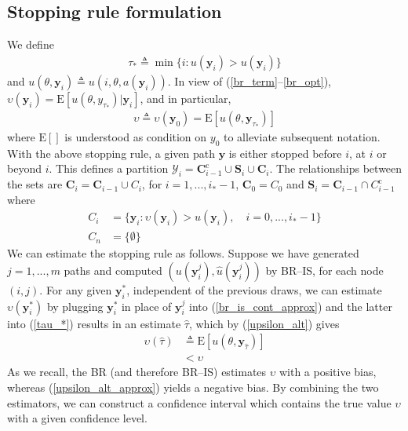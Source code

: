 \documentclass[11pt]{article}
\begin{document}
\subsection{Stopping rule formulation}
We define
\begin{align}\label{tau_*}
\tau_*\triangleq \min\{i:u(\mathbf{y}_i)>u(\mathbf{y}_i)\}
\end{align}and $u(\theta,\mathbf{y}_i)\triangleq u(i,\theta,a(\mathbf{y}_i))$. In view of (\ref{br_term}--\ref{br_opt}), $\upsilon(\mathbf{y}_i)=\mathrm{E}[u(\theta,y_{\tau_*})|\mathbf{y}_i]$, and in particular,
\begin{align}\label{upsilon_alt}
\upsilon\triangleq \upsilon(\mathbf{y}_0)=\mathrm{E}[u(\theta,\mathbf{y}_{\tau_*})]
\end{align}where $\mathrm{E}[]$ is understood as condition on $y_0$ to alleviate subsequent notation. With the above stopping rule, a given path $\mathbf{y}$ is either stopped before $i$, at $i$ or beyond $i$. This defines a partition $\mathcal{Y}_i=\mathbf{C}_{i-1}^{\mathrm{c}}\cup\mathbf{S}_i\cup \mathbf{C}_i$. The relationships between the sets are $\mathbf{C}_i=\mathbf{C}_{i-1}\cup C_i$, for $i=1,...,i_*-1$, $\mathbf{C}_0=C_0$ and $\mathbf{S}_i=\mathbf{C}_{i-1}\cap C_{i-1}^{\mathrm{c}}$ where
\begin{align}
C_i&=\{\mathbf{y}_i:\upsilon(\mathbf{y}_i)>u(\mathbf{y}_i),\quad i=0,...,i_*-1\}\\
C_n&=\{\emptyset\}
\end{align}We can estimate the stopping rule as follows. Suppose we have generated $j=1,...,m$ paths and computed $(u(\mathbf{y}_i^j),\hat u(\mathbf{y}_i^j))$ by BR--IS, for each node $(i,j)$. For any given $\mathbf{y}_i^*$, independent of the previous draws, we can estimate $\upsilon(\mathbf{y}_i^*)$ by plugging $\mathbf{y}_i^*$ in place of $\mathbf{y}_i^j$ into (\ref{br_is_cont_approx}) and the latter into (\ref{tau_*}) results in an estimate $\hat\tau$, which by (\ref{upsilon_alt}) gives
\begin{align}\label{upsilon_alt_approx}
\upsilon(\hat \tau)&\triangleq \mathrm{E}[u(\theta,\mathbf{y}_{\hat \tau})]\\
&<\upsilon
\end{align}As we recall, the BR (and therefore BR--IS) estimates $\upsilon$ with a positive bias, whereas (\ref{upsilon_alt_approx}) yields a negative bias. By combining the two estimators, we can construct a confidence interval which contains the true value $\upsilon$ with a given confidence level.
\end{document}

